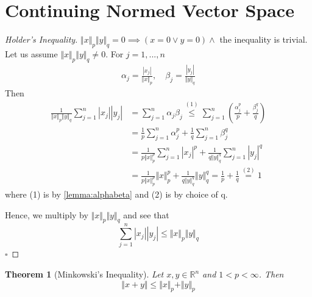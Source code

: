 \documentclass[11pt, oneside]{book}
\theoremstyle{break}
\newtheorem{thm}{Theorem}[section]
\newtheorem*{proof}{Proof}
\newcommand{\bb}[1]{\mathbb{#1}}			%
\newcommand{\qed}{\hfill\ensuremath{\square}}	%
\begin{document}
\section{Continuing Normed Vector Space}\label{sect:normed_cont}

\begin{proof}[Holder's Inequality]
	$\Vert x\Vert _p \Vert y\Vert _q = 0 \implies (x = 0 \lor y = 0) \land $ the inequality is trivial. Let us assume $\Vert x\Vert _p \Vert y\Vert _q \neq 0$. For $j = 1, ..., n$
	\begin{gather*}
		\alpha_j = \frac{|x_j|}{\Vert x\Vert _p}, \quad \beta_j = \frac{|y_j|}{\Vert y\Vert _q}
	\end{gather*}
	Then
	\begin{align*}
		\frac{1}{\Vert x\Vert _p \Vert y\Vert _q} \sum_{j=1}^{n} |x_j||y_j| &= \sum_{j=1}^{n} \alpha_j \beta_j \overset{(1)}{\leq} \sum_{j=1}^{n} \left( \frac{\alpha_j^p}{p} + \frac{\beta_j^q}{q} \right) \\
		&= \frac{1}{p} \sum_{j=1}^{n} \alpha_j^p + \frac{1}{q} \sum_{j=1}^{n} \beta_j^q \\
		&= \frac{1}{p\Vert x\Vert _p^p} \sum_{j=1}^{n} |x_j|^p + \frac{1}{q \Vert y\Vert _q^q} \sum_{j=1}^{n} |y_j|^q \\
		&= \frac{1}{p \Vert x\Vert _p^p} \Vert x\Vert _p^p + \frac{1}{q \Vert y\Vert _q^q} \Vert y\Vert _q^q = \frac{1}{p} + \frac{1}{q} \overset{(2)}{=} 1
	\end{align*}
	where (1) is by \autoref{lemma:alphabeta} and (2) is by choice of q.

	Hence, we multiply by $\Vert x\Vert _p \Vert y\Vert _q$ and see that
	\begin{equation}
		\sum_{j=1}^{n} |x_j||y_j| \leq \Vert x\Vert _p \Vert y\Vert _q
	\end{equation}\qed
\end{proof}

\begin{thm}[Minkowski's Inequality]\label{thm:minkowski}
	Let $x, y \in \bb{R}^n$ and $1 < p < \infty$. Then
	\begin{equation}
		\Vert x + y\Vert  \leq \Vert x\Vert _p + \Vert y\Vert _p
	\end{equation}
\end{thm}
\end{document}
